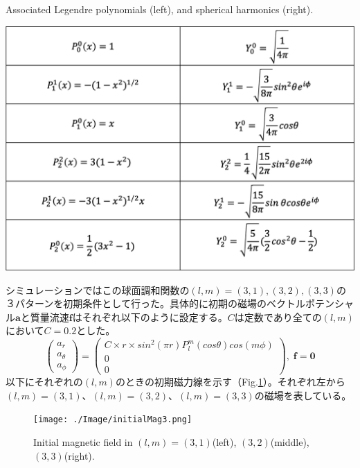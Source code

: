 \documentclass[12pt]{jsarticle}
\begin{document}
\begin{table}[H]
\centering
\caption{Associated Legendre polynomials (left), and spherical harmonics (right).} \label{spherical}
\includegraphics[height=1.0\textheight,width=1.0\hsize,angle=0,keepaspectratio]{./Image/spherical_harmonics.png}
\end{table}

シミュレーションではこの球面調和関数の$(l,m)=(3,1),(3,2),(3,3)$の３パターンを初期条件として行った。具体的に初期の磁場のベクトルポテンシャル$\bm a$と質量流速$\bm f$はそれぞれ以下のように設定する。$C$は定数であり全ての$(l,m)$において$C=0.2$とした。
\begin{equation}
\begin{pmatrix}
a_r \\ a_\theta \\ a_\phi  
\end{pmatrix} 
=
\begin{pmatrix}
C \times r \times sin^2(\pi r) P_l^m (cos\theta)cos(m\phi) \\ 0 \\ 0 
\end{pmatrix} , \;
\bm f = \bm 0
\end{equation}
以下にそれぞれの$(l,m)$のときの初期磁力線を示す（Fig.\ref{initialMag1}）。それぞれ左から$(l,m)=(3,1)$、$(l,m)=(3,2)$、$(l,m)=(3,3)$の磁場を表している。

\begin{figure}[H]
\centering
\texttt{[image: ./Image/initialMag3.png]}
\caption{Initial magnetic field in $(l,m)=(3,1)$(left), $(3,2)$(middle), $(3,3)$(right).  } \label{initialMag1}
\end{figure}
\end{document}
